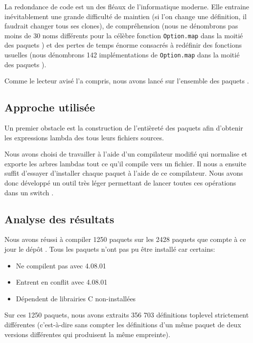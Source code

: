 
La redondance de code est un des fléaux de l'informatique moderne. Elle entraine inévitablement une grande difficulté de maintien (si l'on change une définition, il faudrait changer tous ses clones), de compréhension (nous ne dénombrons pas moins de 30 noms différents pour la célèbre fonction \verb|Option.map| dans la moitié des paquets \Opam) et des pertes de temps énorme consacrés à redéfinir des fonctions usuelles (nous dénombrons 142 implémentations de \verb|Option.map| dans la moitié des paquets \Opam).

Comme le lecteur avisé l'a compris, nous avons lancé {\Asak} sur l'ensemble des paquets {\Opam}.

\subsection{Approche utilisée}

Un premier obstacle est la construction de l'entièreté des paquets {\Opam} afin d'obtenir les expressions lambda des tous leurs fichiers sources.

Nous avons choisi de travailler à l'aide d'un compilateur modifié qui normalise et exporte les arbres lambdas tout ce qu'il compile vers un fichier. Il nous a ensuite suffit d'essayer d'installer chaque paquet {\Opam} à l'aide de ce compilateur. Nous avons donc développé un outil très léger permettant de lancer toutes ces opérations dans un switch {\Opam}.

\subsection{Analyse des résultats}

Nous avons réussi à compiler 1250 paquets sur les 2428 paquets que compte à ce jour le dépôt {\Opam}. Tous les paquets n'ont pas pu être installé car certains:

\begin{itemize}
\item Ne compilent pas avec {\OCaml} 4.08.01
\item Entrent en conflit avec {\OCaml} 4.08.01
\item Dépendent de librairies C non-installées
\end{itemize}

Sur ces 1250 paquets, nous avons extraits 356 703 définitions toplevel strictement différentes (c'est-à-dire sans compter les définitions d'un même paquet de deux versions différentes qui produisent la même empreinte).

